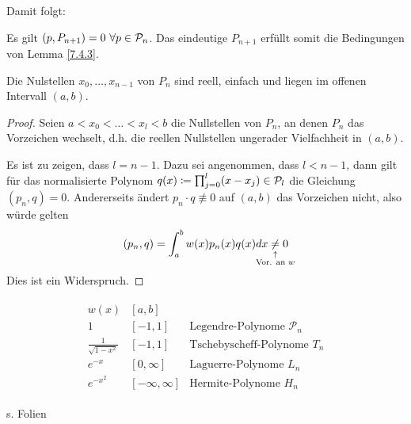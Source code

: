 \documentclass[ngerman,fontsize=11pt, paper=a4, parskip=half, titlepage=true, toc=bib]{scrbook}
\begin{document}
Damit folgt:


\begin{Kore}
  \label{7.4.5}
  Es gilt $(p,P_{n+1})=0~\forall p\in\mathcal{P}_n$.
Das eindeutige $P_{n+1}$ erfüllt somit die
Bedingungen von Lemma \ref{7.4.3}.
\end{Kore}


\begin{Satze}
  Die Nulstellen $x_0,\ldots,x_{n-1}$ von $P_n$
  sind reell, einfach und liegen im offenen Intervall $(a,b)$.

  \begin{proof}
    Seien $a<x_0<\ldots<x_l<b$ die Nullstellen von $P_n$,
    an denen $P_n$ das Vorzeichen wechselt,
    d.h. die reellen Nullstellen ungerader Vielfachheit in $(a,b)$.

    Es ist zu zeigen, dass $l=n-1$.
    Dazu sei angenommen, dass $l<n-1$, 
    dann gilt für das normalisierte Polynom
    $q(x)\coloneqq \prod_{j=0}^{l}(x-x_j)\in\mathcal{P}_l$ die
    Gleichung $(p_n,q)=0$.
    Andererseits ändert $p_n\cdot q\not\equiv 0$ 
    auf $(a,b)$ das  Vorzeichen nicht, also würde gelten
    \begin{gather*}
      (p_n,q)=\int_a^bw(x)p_n(x)q(x)dx
      \underset{\mathclap{\substack{\uparrow\\\text{Vor. an $w$}}}}{\neq} 0
    \end{gather*}
    Dies ist ein Widerspruch.
  \end{proof}
\end{Satze}

\begin{Bspe}
  \begin{align*}
    \begin{array}{lll}
      w(x) & [a,b] \\
      1    & [-1,1] & \text{Legendre-Polynome }\mathcal{P}_n\\
      \frac{1}{\sqrt{1-x^2}} & [-1,1] & \text{Tschebyscheff-Polynome }
                                          T_n\\
      e^{-x} & [0,\infty] &\text{Laguerre-Polynome } L_n\\
      e^{-x^2}& [-\infty,\infty] & \text{Hermite-Polynome } H_n
    \end{array}
  \end{align*}
\end{Bspe}

\begin{Satze} %
  s. Folien
\end{Satze}
\end{document}
